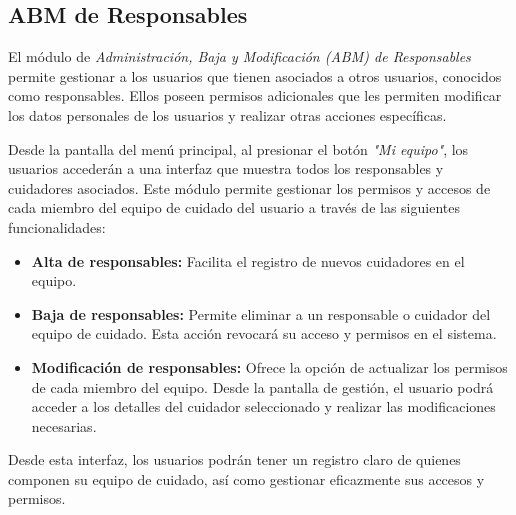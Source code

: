 \documentclass[a4paper,12pt]{article}
\begin{document}
    \subsection{ABM de Responsables}
    \par El módulo de \textit{Administración, Baja y Modificación (ABM) de Responsables} permite gestionar a los usuarios que tienen asociados a otros usuarios, conocidos como responsables. Ellos poseen permisos adicionales que les permiten modificar los datos personales de los usuarios y realizar otras acciones específicas.
    \par Desde la pantalla del menú principal, al presionar el botón \textit{"Mi equipo"}, los usuarios accederán a una interfaz que muestra todos los responsables y cuidadores asociados. Este módulo permite gestionar los permisos y accesos de cada miembro del equipo de cuidado del usuario a través de las siguientes funcionalidades:
    \begin{itemize}
        \item \textbf{Alta de responsables:} Facilita el registro de nuevos cuidadores en el equipo.
        \item \textbf{Baja de responsables:} Permite eliminar a un responsable o cuidador del equipo de cuidado. Esta acción revocará su acceso y permisos en el sistema.
        \item \textbf{Modificación de responsables:} Ofrece la opción de actualizar los permisos de cada miembro del equipo. Desde la pantalla de gestión, el usuario podrá acceder a los detalles del cuidador seleccionado y realizar las modificaciones necesarias.
    \end{itemize}
    \par Desde esta interfaz, los usuarios podrán tener un registro claro de quienes componen su equipo de cuidado, así como gestionar eficazmente sus accesos y permisos.
\end{document}
